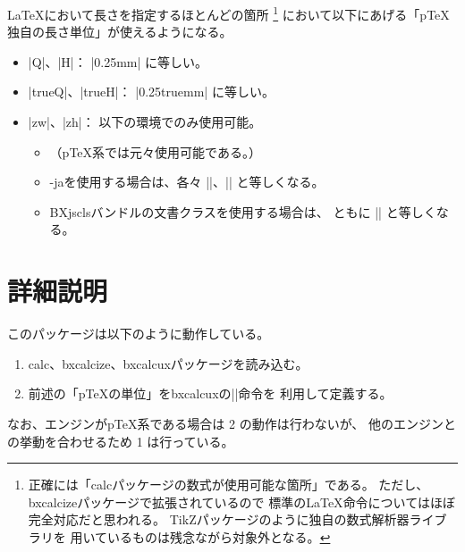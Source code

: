 \documentclass[a4paper]{ltjsarticle}
\newcommand{\Pkg}[1]{\textsf{#1}}
\providecommand{\pTeX}{p\TeX}
\begin{document}
{\LaTeX}において長さを指定するほとんどの箇所
\footnote{正確には「\Pkg{calc}パッケージの数式が使用可能な箇所」である。
ただし、\Pkg{bxcalcize}パッケージで拡張されているので
標準の{\LaTeX}命令についてはほぼ完全対応だと思われる。
\Pkg{TikZ}パッケージのように独自の数式解析器ライブラリを
用いているものは残念ながら対象外となる。}
において以下にあげる「{\pTeX}独自の長さ単位」が使えるようになる。
\begin{itemize}
\item |Q|、|H|： |0.25mm| に等しい。
\item |trueQ|、|trueH|： |0.25truemm| に等しい。
\item |zw|、|zh|： 以下の環境でのみ使用可能。
\begin{itemize}
\item （{\pTeX}系では元々使用可能である。）
\item {\LuaTeX}-jaを使用する場合は、各々 |\zw|、|\zh| と等しくなる。
\item \Pkg{BXjscls}バンドルの文書クラスを使用する場合は、
ともに |\jsZw| と等しくなる。
\end{itemize}
\end{itemize}

\section{詳細説明}

このパッケージは以下のように動作している。
\begin{enumerate}
\item \Pkg{calc}、\Pkg{bxcalcize}、\Pkg{bxcalcux}パッケージを読み込む。
\item 前述の「{\pTeX}の単位」を\Pkg{bxcalcux}の|\DeclareCalcUnit|命令を
利用して定義する。
\end{enumerate}

なお、エンジンが{\pTeX}系である場合は 2 の動作は行わないが、
他のエンジンとの挙動を合わせるため 1 は行っている。
\end{document}

